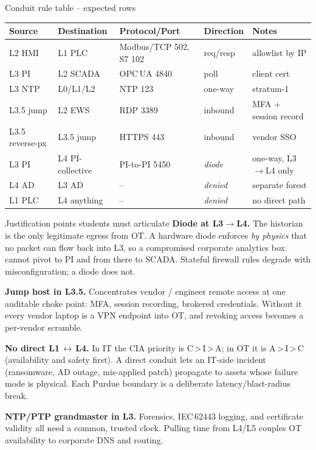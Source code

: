 \documentclass[11pt,a4paper]{article}
\begin{document}
\begin{solutionbox}{Conduit rule table -- expected rows}
\small
\begin{tabular}{@{}lllll@{}}
\toprule
\textbf{Source} & \textbf{Destination} & \textbf{Protocol/Port} & \textbf{Direction} & \textbf{Notes}\\
\midrule
L2 HMI         & L1 PLC                 & Modbus/TCP 502, S7 102 & req/resp & allowlist by IP\\
L3 PI          & L2 SCADA               & OPC\,UA 4840           & poll     & client cert\\
L3 NTP         & L0/L1/L2               & NTP 123                & one-way  & stratum-1\\
L3.5 jump      & L2 EWS                 & RDP 3389               & inbound  & MFA + session record\\
L3.5 reverse-px& L3.5 jump              & HTTPS 443              & inbound  & vendor SSO\\
L3 PI          & L4 PI-collective       & PI-to-PI 5450          & \emph{diode} & one-way, L3$\to$L4 only\\
L4 AD          & L3 AD                  & --                     & \emph{denied} & separate forest\\
L1 PLC         & L4 anything            & --                     & \emph{denied} & no direct path\\
\bottomrule
\end{tabular}
\end{solutionbox}

\begin{solutionbox}{Justification points students must articulate}
\textbf{Diode at L3$\to$L4.} The historian is the only legitimate egress from OT. A hardware diode enforces \emph{by physics} that no packet can flow back into L3, so a compromised corporate analytics box cannot pivot to PI and from there to SCADA. Stateful firewall rules degrade with misconfiguration; a diode does not.

\textbf{Jump host in L3.5.} Concentrates vendor / engineer remote access at one auditable choke point: MFA, session recording, brokered credentials. Without it every vendor laptop is a VPN endpoint into OT, and revoking access becomes a per-vendor scramble.

\textbf{No direct L1\,$\leftrightarrow$\,L4.} In IT the CIA priority is C\,>\,I\,>\,A; in OT it is A\,>\,I\,>\,C (availability and safety first). A direct conduit lets an IT-side incident (ransomware, AD outage, mis-applied patch) propagate to assets whose failure mode is physical. Each Purdue boundary is a deliberate latency/blast-radius break.

\textbf{NTP/PTP grandmaster in L3.} Forensics, IEC\,62443 logging, and certificate validity all need a common, trusted clock. Pulling time from L4/L5 couples OT availability to corporate DNS and routing.
\end{solutionbox}
\end{document}
